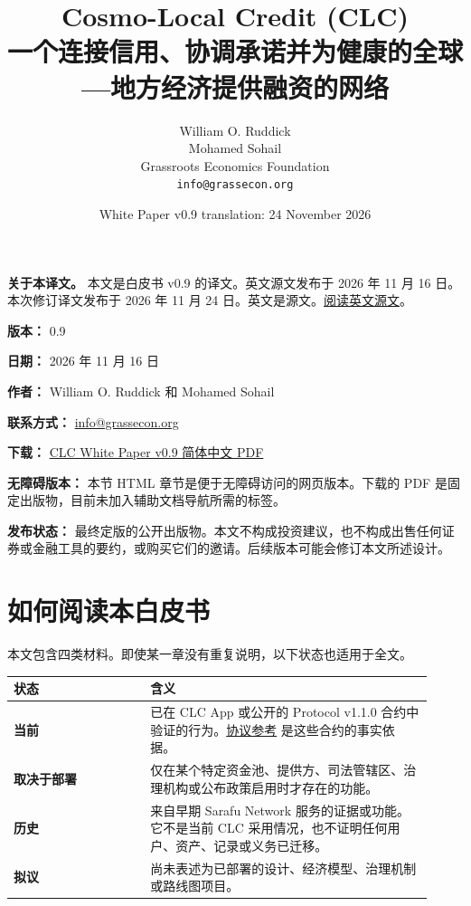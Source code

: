 \documentclass[11pt]{article}
\title{Cosmo-Local Credit (CLC)\\一个连接信用、协调承诺并为健康的全球---地方经济提供融资的网络}
\author{William O. Ruddick \\ Mohamed Sohail \\ Grassroots Economics Foundation \\ \texttt{info@grassecon.org}}
\date{White Paper v0.9 translation: 24 November 2026}
\begin{document}
\maketitle
\tableofcontents
\newpage
\sloppy
\RaggedRight

\textbf{关于本译文。} 本文是白皮书 v0.9 的译文。英文源文发布于 2026 年 11 月 16 日。本次修订译文发布于 2026 年 11 月 24 日。英文是源文。\href{https://docs.cosmolocal.credit/white-paper}{阅读英文源文}。

\textbf{版本：} 0.9

\textbf{日期：} 2026 年 11 月 16 日

\textbf{作者：} William O. Ruddick 和 Mohamed Sohail

\textbf{联系方式：} \href{mailto:info@grassecon.org}{info@grassecon.org}

\textbf{下载：} \href{https://docs.cosmolocal.credit/white-paper/Cosmo-Local-Credit-CLC-White-Paper-v9-zh.pdf}{CLC White Paper v0.9 简体中文 PDF}

\textbf{无障碍版本：} 本节 HTML 章节是便于无障碍访问的网页版本。下载的 PDF 是固定出版物，目前未加入辅助文档导航所需的标签。

\textbf{发布状态：} 最终定版的公开出版物。本文不构成投资建议，也不构成出售任何证券或金融工具的要约，或购买它们的邀请。后续版本可能会修订本文所述设计。

\section*{如何阅读本白皮书}

本文包含四类材料。即使某一章没有重复说明，以下状态也适用于全文。

\begin{longtable}{P{0.30\linewidth} P{0.62\linewidth}}
\toprule
状态 & 含义 \\
\midrule
\endhead
\textbf{当前} & 已在 CLC App 或公开的 Protocol v1.1.0 合约中验证的行为。\href{https://docs.cosmolocal.credit/zh/protocol/overview}{协议参考} 是这些合约的事实依据。 \\
\textbf{取决于部署} & 仅在某个特定资金池、提供方、司法管辖区、治理机构或公布政策启用时才存在的功能。 \\
\textbf{历史} & 来自早期 Sarafu Network 服务的证据或功能。它不是当前 CLC 采用情况，也不证明任何用户、资产、记录或义务已迁移。 \\
\textbf{拟议} & 尚未表述为已部署的设计、经济模型、治理机制或路线图项目。 \\
\bottomrule
\end{longtable}
\end{document}

